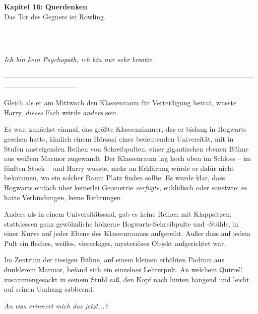 

\hypertarget{querdenken}{%

\textbf{Kapitel 16: Querdenken}\\

\hfill\break Das Tor des Gegners ist Rowling.

--------------------------------------------------------------------------------------------------------------------------------------------

\hfill\break

\emph{Ich bin kein Psychopath, ich bin nur sehr kreativ.}

\hfill\break

--------------------------------------------------------------------------------------------------------------------------------------------

\hfill\break Gleich als er am Mittwoch den Klassenraum für Verteidigung betrat, wusste Harry, \emph{dieses} Fach würde \emph{anders} sein.

Es war, zunächst einmal, das größte Klassenzimmer, das er bislang in Hogwarts gesehen hatte, ähnlich einem Hörsaal einer bedeutenden Universität, mit in Stufen ansteigenden Reihen von Schreibpulten, einer gigantischen ebenen Bühne aus weißem Marmor zugewandt. Der Klassenraum lag hoch oben im Schloss -- im fünften Stock -- und Harry wusste, mehr an Erklärung würde er dafür nicht bekommen, wo ein solcher Raum Platz finden sollte. Es wurde klar, dass Hogwarts einfach über keinerlei Geometrie \emph{verfügte,} euklidisch oder sonstwie; es hatte Verbindungen, keine Richtungen.

Anders als in einem Universitätssaal, gab es keine Reihen mit Klappsitzen; stattdessen ganz gewöhnliche hölzerne Hogwarts-Schreibpulte und -Stühle, in einer Kurve auf jeder Ebene des Klassenraumes aufgereiht. Außer dass auf jedem Pult ein flaches, weißes, viereckiges, mysteriöses Objekt aufgerichtet war.

Im Zentrum der riesigen Bühne, auf einem kleinen erhöhten Podium aus dunklerem Marmor, befand sich ein einzelnes Lehrerpult. An welchem Quirrell zusammengesackt in seinem Stuhl saß, den Kopf nach hinten hängend und leicht auf seinen Umhang sabbernd.

\emph{An was erinnert mich das jetzt...?}

}
